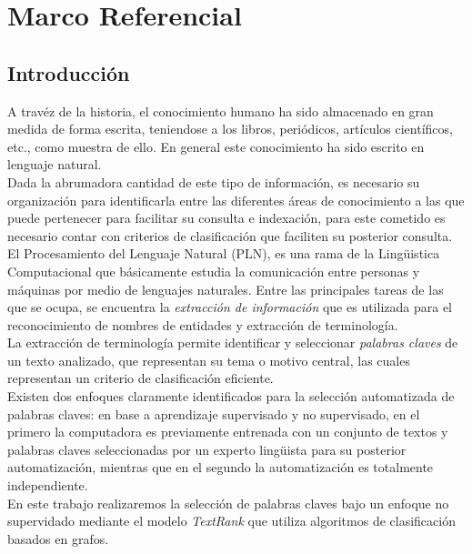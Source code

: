 \chapter{Marco Referencial}
\section{Introducci\'on}
A trav\'ez de la historia, el conocimiento humano ha sido almacenado en gran medida
de forma escrita, teniendose a los libros, peri\'odicos, art\'iculos cient\'ificos,
etc., como muestra de ello. En general este conocimiento ha sido escrito en lenguaje
natural. \\

Dada la abrumadora cantidad de este tipo de informaci\'on, es necesario su 
organizaci\'on para identificarla entre las diferentes \'areas de conocimiento 
a las que puede pertenecer para facilitar su consulta e indexaci\'on, para este 
cometido es necesario contar con criterios de clasificaci\'on que faciliten su 
posterior consulta. \\

El Procesamiento del Lenguaje Natural (PLN), es una rama de la Ling\"uistica 
Computacional que b\'asicamente estudia la comunicaci\'on entre personas y 
m\'aquinas por medio de lenguajes naturales. Entre las principales tareas de las que 
se ocupa, se encuentra la \emph{extracci\'on de informaci\'on} que es utilizada 
para el reconocimiento de nombres de entidades y extracci\'on de terminolog\'ia. \\

La extracci\'on de terminolog\'ia permite identificar y seleccionar 
\emph{palabras claves} de un texto analizado, que representan su tema o 
motivo central, las cuales representan un criterio de clasificaci\'on eficiente.\\

Existen dos enfoques claramente identificados para la selecci\'on automatizada
de palabras claves: en base a aprendizaje supervisado y no supervisado, en el primero 
la computadora es previamente entrenada con un conjunto de textos y palabras 
claves seleccionadas por un experto ling\"uista para su posterior automatizaci\'on, 
mientras que en el segundo la automatizaci\'on es totalmente independiente.\\

En este trabajo realizaremos la selecci\'on de palabras claves bajo un enfoque no
supervidado mediante el modelo \emph{TextRank} que utiliza algoritmos de 
clasificaci\'on basados en grafos.\\

